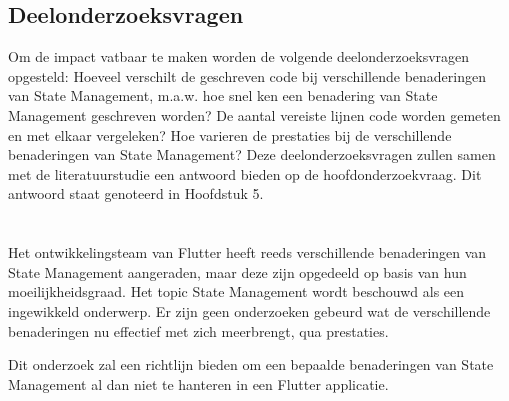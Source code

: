 \subsection{Deelonderzoeksvragen}
Om de impact vatbaar te maken worden de volgende deelonderzoeksvragen opgesteld:
Hoeveel verschilt de geschreven code bij verschillende benaderingen van State Management, m.a.w.
hoe snel ken een benadering van State Management geschreven worden? De aantal vereiste lijnen code
worden gemeten en met elkaar vergeleken?
Hoe varieren de prestaties bij de verschillende benaderingen van State Management?
\newline
Deze deelonderzoeksvragen zullen samen met de literatuurstudie een antwoord bieden op de hoofdonderzoekvraag. Dit antwoord staat genoteerd in Hoofdstuk 5.


\section{}
\label{sec:onderzoeksdoelstelling}

Het ontwikkelingsteam van Flutter heeft reeds verschillende benaderingen van State Management aangeraden, maar deze zijn opgedeeld op basis van hun moeilijkheidsgraad. Het topic State Management wordt beschouwd als een ingewikkeld onderwerp. Er zijn geen onderzoeken gebeurd wat de verschillende benaderingen nu effectief met zich meerbrengt, qua prestaties.

Dit onderzoek zal een richtlijn bieden om een bepaalde benaderingen van State Management al dan niet te hanteren in een Flutter applicatie. 

\section{}
\label{sec:opzet-bachelorproef}


